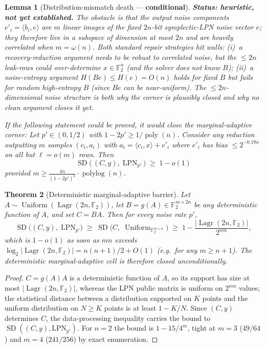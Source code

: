 \documentclass[11pt,a4paper]{article}
\theoremstyle{plain}
\newtheorem{theorem}{Theorem}[section]
\newtheorem{lemma}[theorem]{Lemma}
\theoremstyle{definition}
\newcommand{\F}{\mathbb{F}}
\DeclareMathOperator{\Lagr}{Lagr}
\begin{document}
\begin{lemma}[Distribution-mismatch death --- \textbf{conditional}]
\label{lem:m2}
\textbf{Status: heuristic, not yet established.}  The obstacle is that the output noise components $e'_i=\langle b_i,e\rangle$ are $m$ linear images of the fixed $2n$-bit symplectic-LPN noise vector $e$; they therefore live in a subspace of dimension at most $2n$ and are heavily correlated when $m=\omega(n)$.  Both standard repair strategies hit walls: (i)~a recovery-reduction argument needs  to be robust to correlated noise, but the $\le 2n$ leak-rows could over-determine $x\in\F_2^{n}$ (and the solver does not know $B$); (ii)~a noise-entropy argument $H(Be)\le H(e)=O(n)$ holds for fixed $B$ but fails for random high-entropy $B$ (since $Be$ can be near-uniform).  The $\le 2n$-dimensional noise structure is both why the corner is plausibly closed and why no clean argument closes it yet.

\emph{If} the following statement could be proved, it would close the marginal-adaptive corner: Let $p'\in(0,1/2)$ with $1-2p'\ge 1/\operatorname{poly}(n)$.  Consider any reduction outputting $m$ samples $(c_i,a_i)$ with $a_i=\langle c_i,x\rangle+e'_i$ where $e'_i$ has bias $\le 2^{-0.19n}$ on all but $\ell=o(m)$ rows.  Then
\[
\operatorname{SD}\bigl(\,(C,y),\;\mathrm{LPN}_{p'}\,\bigr)
\;\ge\;
1-o(1)
\]
provided $m\ge \frac{4n}{(1-2p')^{2}}\cdot\operatorname{polylog}(n)$.
\end{lemma}

\begin{theorem}[Deterministic marginal-adaptive barrier]
\label{thm:deterministic-marginal-adaptive}
Let $A\sim\operatorname{Uniform}(\Lagr(2n,\F_2))$, let $B=g(A)\in\F_2^{m\times 2n}$ be any \emph{deterministic} function of $A$, and set $C=BA$. Then for every noise rate $p'$,
\[
\operatorname{SD}\bigl((C,y),\;\mathrm{LPN}_{p'}\bigr)
\;\ge\;
\operatorname{SD}\bigl(C,\;\operatorname{Uniform}_{\F_2^{m\times n}}\bigr)
\;\ge\;
1-\frac{|\Lagr(2n,\F_2)|}{2^{mn}},
\]
which is $1-o(1)$ as soon as $mn$ exceeds $\log_2|\Lagr(2n,\F_2)|=n(n+1)/2+O(1)$ (e.g.\ for any $m\ge n+1$). The deterministic marginal-adaptive cell is therefore closed unconditionally.
\end{theorem}

\begin{proof}
$C=g(A)A$ is a deterministic function of $A$, so its support has size at most $|\Lagr(2n,\F_2)|$, whereas the LPN public matrix is uniform on $2^{mn}$ values; the statistical distance between a distribution supported on $K$ points and the uniform distribution on $N\ge K$ points is at least $1-K/N$. Since $(C,y)$ determines $C$, the data-processing inequality carries the bound to $\operatorname{SD}((C,y),\mathrm{LPN}_{p'})$. For $n=2$ the bound is $1-15/4^m$, tight at $m=3$ ($49/64$) and $m=4$ ($241/256$) by exact enumeration.
\end{proof}
\end{document}
